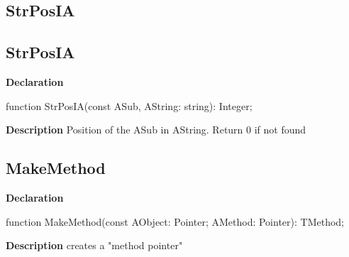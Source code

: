 \documentclass{report}
\newif\ifpdf
\begin{document}
\subsection*{\large{\textbf{StrPosIA}}\normalsize\hspace{1ex}\hrulefill}
\else
\subsection*{StrPosIA}
\fi
\label{PasDoc_Utils-StrPosIA}
\begin{list}{}{
\setlength{\itemindent}{0cm}
\setlength{\listparindent}{0cm}
\setlength{\leftmargin}{\evensidemargin}
\addtolength{\leftmargin}{\tmplength}
\settowidth{\labelsep}{X}
\addtolength{\leftmargin}{\labelsep}
\setlength{\labelwidth}{\tmplength}
}
\item[\textbf{Declaration}\hfill]
\ifpdf
\begin{flushleft}
\fi
\begin{ttfamily}
function StrPosIA(const ASub, AString: string): Integer;\end{ttfamily}

\ifpdf
\end{flushleft}
\fi

\par
\item[\textbf{Description}]
Position of the ASub in AString. Return 0 if not found

\end{list}
\ifpdf
\subsection*{\large{\textbf{MakeMethod}}\normalsize\hspace{1ex}\hrulefill}
\else
\subsection*{MakeMethod}
\fi
\label{PasDoc_Utils-MakeMethod}
\begin{list}{}{
\setlength{\itemindent}{0cm}
\setlength{\listparindent}{0cm}
\setlength{\leftmargin}{\evensidemargin}
\addtolength{\leftmargin}{\tmplength}
\settowidth{\labelsep}{X}
\addtolength{\leftmargin}{\labelsep}
\setlength{\labelwidth}{\tmplength}
}
\item[\textbf{Declaration}\hfill]
\ifpdf
\begin{flushleft}
\fi
\begin{ttfamily}
function MakeMethod(const AObject: Pointer; AMethod: Pointer): TMethod;\end{ttfamily}

\ifpdf
\end{flushleft}
\fi

\par
\item[\textbf{Description}]
creates a "method pointer"

\end{list}
\ifpdf
\end{document}
